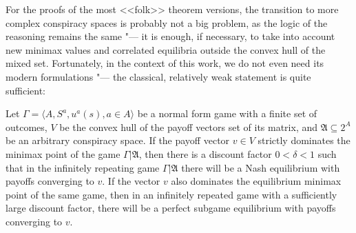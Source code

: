 For the proofs of the most <<folk>> theorem versions, the transition to more complex conspiracy spaces is probably not a big problem, as the logic of the reasoning remains the same "--- it is enough, if necessary, to take into account new minimax values and correlated equilibria outside the convex hull of the mixed set. Fortunately, in the context of this work, we do not even need its modern formulations "--- the classical, relatively weak statement is quite sufficient: %
\begin{theorem}\label{the:folk}
	Let $\Gamma = \langle A, S^a, u^a(s), a \in A \rangle$ be a normal form game with a finite set of outcomes, $V$ be the convex hull of the payoff vectors set of its matrix, and $\mathfrak{A} \subseteq 2^A$ be an arbitrary conspiracy space. If the payoff vector $v \in V$ strictly dominates the minimax point of the game $\Gamma | \mathfrak{A}$, then there is a discount factor $0 < \delta < 1$ such that in the infinitely repeating game $\Gamma | \mathfrak{A}$ there will be a Nash equilibrium with payoffs converging to $v$. If the vector $v$ also dominates the equilibrium minimax point of the same game, then in an infinitely repeated game with a sufficiently large discount factor, there will be a perfect subgame equilibrium with payoffs converging to $v$. %
\end{theorem}
